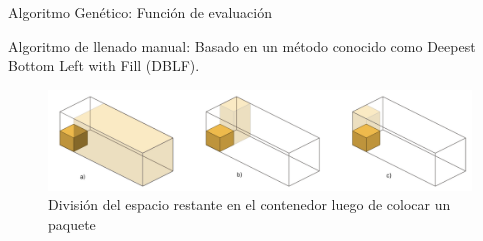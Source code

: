 \documentclass[handout]{beamer}
\begin{document}
\begin{frame}{Algoritmo Genético: Función de evaluación}
    \begin{exampleblock}{Algoritmo de llenado manual:}
        Basado en un método conocido como Deepest Bottom Left with Fill (DBLF).
        \begin{figure}
            \centering
            \includegraphics[width=1\textwidth]{pic/dblf.png}
            \caption*{División del espacio restante en el contenedor luego de colocar un paquete}
            \label{fig:dblf}
        \end{figure}
    \end{exampleblock}
\end{frame}
\end{document}
